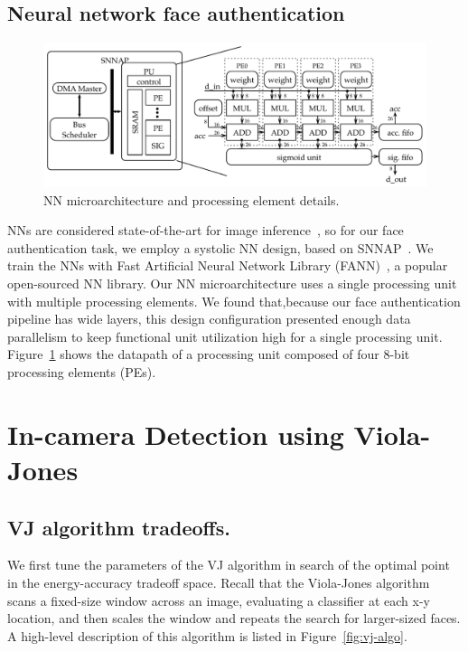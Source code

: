 \subsection{Neural network face authentication}

\begin{figure}
  \includegraphics[width=\textwidth]{nsp-figs/snnap_pu_new.pdf}
  \caption{NN microarchitecture and processing element details.}
  \label{fig:snnap-pu}
\end{figure}

NNs are considered state-of-the-art for image inference~\cite{amos2016openface}, so for our face authentication task, we employ a systolic NN design, based on SNNAP~\cite{snnap,moreau-bitwidth}.
We train the NNs with Fast Artificial Neural Network Library (FANN)~\cite{fann}, a popular open-sourced NN library.
Our NN microarchitecture uses a single processing unit with multiple processing elements.
We found that,because our face authentication pipeline has wide layers, this design configuration presented enough data parallelism to keep functional unit utilization high for a single processing unit.
Figure~\ref{fig:snnap-pu} shows the datapath of a processing unit composed of four 8-bit processing elements (PEs).

\section{In-camera Detection using Viola-Jones}

\subsection{VJ algorithm tradeoffs.}
We first tune the parameters of the VJ algorithm in search of the optimal point in the energy-accuracy tradeoff space.
Recall that the Viola-Jones algorithm scans a fixed-size window across an image,
evaluating a classifier at each x-y location, and then scales the window and repeats
the search for larger-sized faces.
A high-level description of this algorithm is listed in Figure~\ref{fig:vj-algo}.

